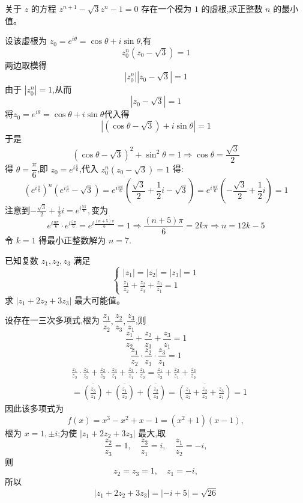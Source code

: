 \begin{questions}
    \question 关于 $z$ 的方程 $z^{n+1} - \sqrt{3}z^n - 1 = 0$ 存在一个模为 $1$ 的虚根,求正整数 $n$ 的最小值。
    \begin{solution}
        设该虚根为 $z_0= e^{i\theta} = \cos\theta + i\sin\theta$,有        
        \[
        z_0^n(z_0 - \sqrt{3}) = 1
        \]
        两边取模得
        \[
         |z_0^n||z_0 - \sqrt{3}| = 1
        \]
        由于 $|z_0^n| = 1$,从而
        \[
        |z_0 - \sqrt{3}| = 1
        \]
        将$z_0= e^{i\theta} = \cos\theta + i\sin\theta$代入得
        \[
        |(\cos\theta - \sqrt{3}) + i\sin\theta| = 1
        \]
        于是
        \[
        (\cos\theta - \sqrt{3})^2 + \sin^2\theta = 1 \Rightarrow \cos\theta = \frac{\sqrt{3}}{2}
        \]
        得 $\theta = \dfrac{\pi}{6}$,即 $z_0 = e^{i\frac{\pi}{6}}$,代入 $z_0^n(z_0 - \sqrt{3}) = 1$ 得:
        \[
        \left(e^{i\frac{\pi}{6}}\right)^n \left(e^{i\frac{\pi}{6}} - \sqrt{3}\right) =
        e^{i\frac{n\pi}{6}} \left( \frac{\sqrt{3}}{2} + \frac{1}{2}i - \sqrt{3} \right) = e^{i\frac{n\pi}{6}} \left( -\frac{\sqrt{3}}{2} + \frac{1}{2}i \right) = 1
        \]
        注意到$-\frac{\sqrt{3}}{2} + \frac{1}{2}i = e^{i\frac{5\pi}{6}},$变为
        \[
        e^{i\frac{n\pi}{6}} \cdot e^{i\frac{5\pi}{6}}= e^{i\frac{(n+5)\pi}{6}}= 1 \Rightarrow \frac{(n+5)\pi}{6} = 2k\pi \Rightarrow n = 12k - 5
        \]
        令 $k=1$ 得最小正整数解为 $n = 7$.
    \end{solution}

    \question 已知复数 \(z_1, z_2, z_3\) 满足
    \[
    \begin{cases}
    |z_1| = |z_2| = |z_3| = 1 \\[1mm]
    \displaystyle \frac{z_1}{z_2} + \frac{z_2}{z_3} + \frac{z_3}{z_1} = 1
    \end{cases}
    \]
    求 \(|z_1 + 2 z_2 + 3 z_3|\) 最大可能值。
    \begin{solution}
        设存在一三次多项式,根为 \(\dfrac{z_1}{z_2}, \dfrac{z_2}{z_3}, \dfrac{z_3}{z_1}\),则
        \[
        \frac{z_1}{z_2} + \frac{z_2}{z_3} + \frac{z_3}{z_1} = 1 
        \]
        \[
        \frac{z_1}{z_2} \cdot \frac{z_2}{z_3} \cdot \frac{z_3}{z_1} = 1
        \]
        \begin{align*}
        &\frac{z_1}{z_2} \cdot \frac{z_2}{z_3} + \frac{z_2}{z_3} \cdot \frac{z_3}{z_1} + \frac{z_3}{z_1} \cdot \frac{z_1}{z_2} = \frac{z_1}{z_3} + \frac{z_2}{z_1} + \frac{z_3}{z_2} \\
        &= \overline{\left(\frac{z_3}{z_1}\right)} + \overline{\left(\frac{z_1}{z_2}\right)} + \overline{\left(\frac{z_2}{z_3}\right)} = \overline{\left(\frac{z_1}{z_2} + \frac{z_2}{z_3} + \frac{z_3}{z_1}\right)} = 1
        \end{align*}
        因此该多项式为
        \[
        f(x) = x^3 - x^2 + x - 1 = (x^2 + 1)(x - 1),
        \]
        根为 \(x = 1, \pm i\);为使 \(|z_1 + 2 z_2 + 3 z_3|\) 最大,取
        \[
        \frac{z_2}{z_3} = 1, \quad \frac{z_3}{z_1} = i, \quad \frac{z_1}{z_2} = -i,
        \]
        则
        \[
        z_2 = z_3 = 1, \quad z_1 = -i,
        \]
        所以
        \[
        |z_1 + 2 z_2 + 3 z_3| = |-i + 5| = \sqrt{26}
        \]
    \end{solution}


\end{questions}
